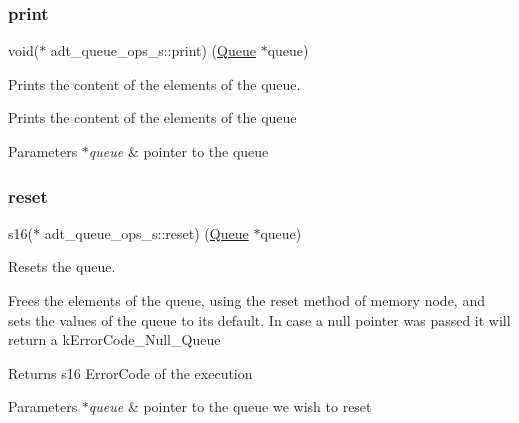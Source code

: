 \subsubsection{\texorpdfstring{print}{print}}
{\footnotesize\ttfamily void($\ast$ adt\+\_\+queue\+\_\+ops\+\_\+s\+::print) (\hyperlink{structadt__queue__s}{Queue} $\ast$queue)}



Prints the content of the elements of the queue. 

Prints the content of the elements of the queue


\begin{DoxyParams}{Parameters}
{\em $\ast$queue} & pointer to the queue \\
\hline
\end{DoxyParams}
\mbox{\label{structadt__queue__ops__s_aa3cfb116ee706ee5dfc066ef075f5182}} 
\subsubsection{\texorpdfstring{reset}{reset}}
{\footnotesize\ttfamily s16($\ast$ adt\+\_\+queue\+\_\+ops\+\_\+s\+::reset) (\hyperlink{structadt__queue__s}{Queue} $\ast$queue)}



Resets the queue. 

Frees the elements of the queue, using the reset method of memory node, and sets the values of the queue to it\textquotesingle{}s default. In case a null pointer was passed it will return a k\+Error\+Code\+\_\+\+Null\+\_\+\+Queue

\begin{DoxyReturn}{Returns}
s16 Error\+Code of the execution 
\end{DoxyReturn}

\begin{DoxyParams}{Parameters}
{\em $\ast$queue} & pointer to the queue we wish to reset \\
\hline
\end{DoxyParams}
\mbox{\label{structadt__queue__ops__s_a21c88cc6f73093960ac29db7ff2b4872}} 
